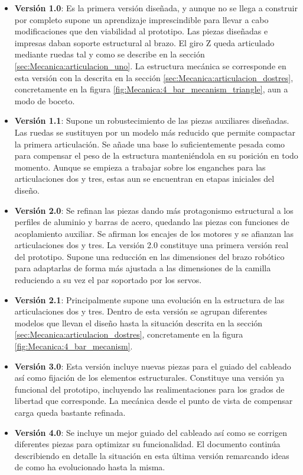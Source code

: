 \begin{itemize}
	\item \textbf{Versión 1.0}: Es  la primera versión diseñada, y aunque no se llega a construir por completo supone un aprendizaje imprescindible para llevar a cabo modificaciones que den viabilidad al prototipo. Las piezas diseñadas e impresas daban soporte estructural al brazo. El giro Z queda articulado mediante ruedas tal y como se describe en la sección \ref{sec:Mecanica:articulacion_uno}. La estructura mecánica se corresponde en esta versión con la descrita en la sección \ref{sec:Mecanica:articulacion_dostres}, concretamente en la figura \ref{fig:Mecanica:4_bar_mecanism_triangle}, aun a modo de boceto.
	\item \textbf{Versión 1.1}: Supone un robustecimiento de las piezas auxiliares diseñadas. Las ruedas se sustituyen por un modelo más reducido que permite compactar la primera articulación. Se añade una base lo suficientemente pesada como para compensar el peso de la estructura manteniéndola en su posición en todo momento. Aunque se empieza a trabajar sobre los enganches para las articulaciones dos y tres, estas aun se encuentran en etapas iniciales del diseño.
	\item \textbf{Versión 2.0}: Se refinan las piezas dando más protagonismo estructural a los perfiles de aluminio y barras de acero, quedando las piezas con funciones de acoplamiento auxiliar. Se afirman los encajes de los motores y se afianzan las articulaciones dos y tres. La versión 2.0 constituye una primera versión real del prototipo. Supone una reducción en las dimensiones del brazo robótico para adaptarlas de forma más ajustada a las dimensiones de la camilla reduciendo a su vez el par soportado por los servos.
	\item \textbf{Versión 2.1}: Principalmente supone una evolución en la estructura de las articulaciones dos y tres. Dentro de esta versión se agrupan diferentes modelos que llevan el diseño hasta la situación descrita en la sección \ref{sec:Mecanica:articulacion_dostres}, concretamente en la figura \ref{fig:Mecanica:4_bar_mecanism}.
	\item \textbf{Versión 3.0}: Esta versión incluye nuevas piezas para el guiado del cableado así como fijación de los elementos estructurales. Constituye una versión ya funcional del prototipo, incluyendo las realimentaciones para los grados de libertad que corresponde. La mecánica desde el punto de vista de compensar carga queda bastante refinada.
	\item \textbf{Versión 4.0}: Se incluye un mejor guiado del cableado así como se corrigen diferentes piezas para optimizar su funcionalidad. El documento continúa describiendo en detalle la situación en esta última versión remarcando ideas de como ha evolucionado hasta la misma.
\end{itemize}


